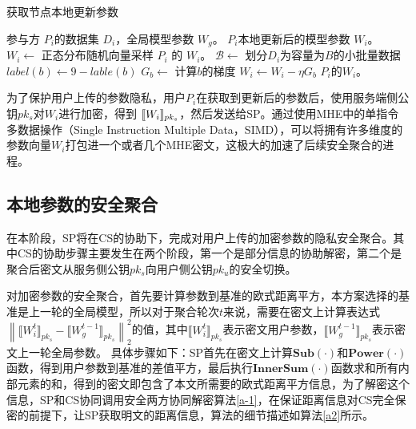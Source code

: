 \begin{algorithm}[htbp]
	\caption{获取节点本地更新参数}
	\label{a1}
	\begin{algorithmic}[1]
		\REQUIRE 参与方 $P_i$的数据集 $D_i$，全局模型参数 $W_g$。
		\ENSURE $P_i$本地更新后的模型参数 $W_i$。
		\STATE $W_i \leftarrow$ 正态分布随机向量采样
		\RETURN $P_i$ 的 $W_i$。
		\ELSE
		\STATE $\mathcal{B}\leftarrow$ 划分$D_i$为容量为$ B $的小批量数据
		\STATE $label(b) \leftarrow 9-lable(b)$
		\ENDIF
		\STATE $G_{b}\leftarrow$ 计算$b$的梯度
		\STATE $W_i\leftarrow W_i - \eta G_{b}$
		\ENDFOR
		\ENDFOR
		\RETURN $P_i$的$W_i$。
		\ENDIF
	\end{algorithmic}
\end{algorithm}

为了保护用户上传的参数隐私，用户$P_i$在获取到更新后的参数后，使用服务端侧公钥$ pk_s $对$ W_i $进行加密，得到 $ \ctx[pk_s]{W_i} $，然后发送给SP。通过使用MHE中的单指令多数据操作（Single Instruction Multiple Data，SIMD），可以将拥有许多维度的参数向量$W_i$打包进一个或者几个MHE密文，这极大的加速了后续安全聚合的进程。

\subsection{本地参数的安全聚合}
在本阶段，SP将在CS的协助下，完成对用户上传的加密参数的隐私安全聚合。其中CS的协助步骤主要发生在两个阶段，第一个是部分信息的协助解密，第二个是聚合后密文从服务侧公钥$ pk_s $向用户侧公钥$pk_u$的安全切换。

对加密参数的安全聚合，首先要计算参数到基准的欧式距离平方，本方案选择的基准是上一轮的全局模型，所以对于聚合轮次$ t $来说，需要在密文上计算表达式$\left\| \llbracket W_i^{t} \rrbracket_{pk_s} - \llbracket W_g^{t-1} \rrbracket_{pk_s} \right\|_2^2$的值，其中$ \llbracket W_i^{t} \rrbracket_{pk_s} $表示密文用户参数，$ \llbracket W_g^{t-1} \rrbracket_{pk_s} $表示密文上一轮全局参数。
具体步骤如下：SP首先在密文上计算$\textbf{Sub}(\cdot)$和$ \textbf{Power}(\cdot) $函数，得到用户参数到基准的差值平方，最后执行$ \textbf{InnerSum}(\cdot) $函数求和所有内部元素的和，得到的密文即包含了本文所需要的欧式距离平方信息，为了解密这个信息，SP和CS协同调用安全两方协同解密算法\ref{a-1}，在保证距离信息对CS完全保密的前提下，让SP获取明文的距离信息，算法的细节描述如算法\ref{a2}所示。

